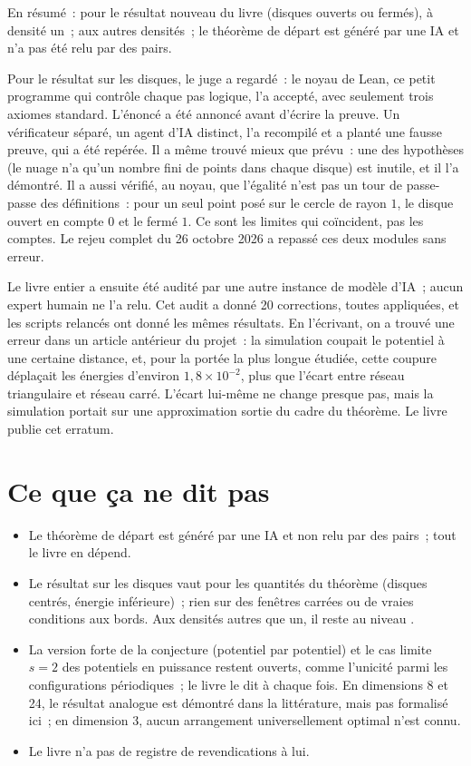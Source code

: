En résumé~:  pour le résultat nouveau du livre (disques ouverts ou fermés), à densité un~;  aux
autres densités~; le théorème de départ est généré par une IA et n'a pas été relu par des pairs.

Pour le résultat sur les disques, \og le juge a regardé\fg~: le noyau de Lean, ce petit programme qui contrôle chaque pas
logique, l'a accepté, avec seulement trois axiomes standard. L'énoncé a été annoncé avant d'écrire la preuve. Un
vérificateur séparé, un agent d'IA distinct, l'a recompilé et a planté une fausse preuve, qui a été repérée. Il
a même trouvé mieux que prévu~: une des hypothèses (le nuage n'a qu'un nombre fini de points dans chaque disque)
est inutile, et il l'a démontré. Il a aussi vérifié, au noyau, que l'égalité n'est pas un tour de passe-passe des
définitions~: pour un seul point posé sur le cercle de rayon $1$, le disque ouvert en compte $0$ et le fermé $1$.
Ce sont les limites qui coïncident, pas les comptes. Le rejeu complet du 26 octobre 2026 a repassé ces deux modules
sans erreur.

Le livre entier a ensuite été audité par une autre instance de modèle d'IA~; aucun expert humain ne l'a relu.
Cet audit a donné 20 corrections, toutes appliquées, et les
scripts relancés ont donné les mêmes résultats. En l'écrivant, on a trouvé une erreur dans un article antérieur du
projet~: la simulation coupait le potentiel à une certaine distance, et, pour la portée la plus longue étudiée, cette
coupure déplaçait les énergies d'environ $1{,}8\times10^{-2}$, plus que l'écart entre réseau triangulaire et réseau carré. L'écart lui-même ne change
presque pas, mais la simulation portait sur une approximation sortie du cadre du théorème. Le livre publie cet
erratum.

\section*{Ce que ça ne dit pas}

\begin{limite}
\begin{itemize}
\item Le théorème de départ est généré par une IA et non relu par des pairs~; tout le livre en dépend.
\item Le résultat sur les disques vaut pour les quantités du théorème (disques centrés, énergie \og inférieure\fg)~;
  rien sur des fenêtres carrées ou de vraies conditions aux bords. Aux densités autres que un, il reste au niveau
  .
\item La version forte de la conjecture (potentiel par potentiel) et le cas limite $s=2$ des potentiels en
  puissance restent ouverts, comme l'unicité parmi les configurations périodiques~; le livre le dit à chaque fois.
  En dimensions 8 et 24, le résultat analogue est démontré dans la littérature, mais pas formalisé ici~; en
  dimension 3, aucun arrangement universellement optimal n'est connu.
\item Le livre n'a pas de registre de revendications à lui.
\end{itemize}
\end{limite}

